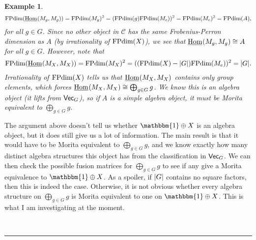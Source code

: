 \documentclass[12pt, reqno]{amsart}
\makeatletter
\def\section{\@startsection{section}{1}\z@{0pt}{0.5\linespacing}{\LARGE\scshape}}
\numberwithin{equation}{section}
\theoremstyle{plainspace}
\theoremstyle{definitionspace}
\newtheorem{example}[theorem]{Example}
\theoremstyle{remarkspace}
\newcommand{\sectionbar}[4]{
	\noindent\\[#3\linespacing] \rule{#1\linewidth}{#2} \\[#4\linespacing]
}
\DeclarePairedDelimiter{\abs}{\lvert}{\rvert}
\newcommand{\mathcat}[1]{\mathcal{#1}}
\newcommand{\IntHom}[2][]{
	\ifthenelse{\equal{#2}{}}
		{\underline{\textup{Hom}}_{#1}}
		{\underline{\textup{Hom}}_{#1}\!\left(#2\right)}
}
\newcommand{\textcat}[1]{\textup{\textsf{#1}}}
\newcommand{\FPdim}{\textup{FPdim}}
\makeatother
\begin{document}
\begin{example}
\begin{align*}
\begin{split}
\FPdim(\IntHom{M_g, M_g}) = \FPdim(M_g)^2 = (\FPdim(g)\FPdim(M_e))^2 = \FPdim(M_e)^2 = \FPdim(A),
\end{split}
\end{align*}
for all $g \in G$. Since no other object in $\mathcat{C}$ has the same Frobenius-Perron dimension as $A$ (by irrationality of $\FPdim(X)$), we see that $\IntHom{M_g, M_g} \cong A$ for all $g \in G$. However, note that
\begin{align*}
\begin{split}
\FPdim(\IntHom{M_X, M_X}) = \FPdim(M_X)^2 = ((\FPdim(X) - \abs{G})\FPdim(M_e))^2 = \abs{G}.
\end{split}
\end{align*}
Irrationality of $\FPdim(X)$ tells us that $\IntHom{M_X, M_X}$ contains only group elements, which forces $\IntHom{M_X, M_X} \cong \bigoplus_{g \in G}{g}$. We know this is an algebra object (it lifts from $\textcat{Vec}_G$), so if $A$ is a simple algebra object, it must be Morita equivalent to $\bigoplus_{g \in G}{g}$.
\end{example}
\leavevmode

\noindent The argument above doesn't tell us whether $\mathbbm{1} \oplus X$ is an algebra object, but it does still give us a lot of information. The main result is that it would have to be Morita equivalent to $\bigoplus_{g \in G}{g}$, and we know exactly how many distinct algebra structures this object has from the classification in $\textcat{Vec}_G$. We can then check the possible fusion matrices for $\bigoplus_{g \in G}{g}$ to see if any give a Morita equivalence to $\mathbbm{1} \oplus X$. As a spoiler, if $\abs{G}$ contains no square factors, then this is indeed the case. Otherwise, it is not obvious whether every algebra structure on $\bigoplus_{g \in G}{g}$ is Morita equivalent to one on $\mathbbm{1} \oplus X$. This is what I am investigating at the moment.
\newpage

\section{References}
\sectionbar{1}{1pt}{-2}{0}

\printbibliography[heading = none]
\end{document}
